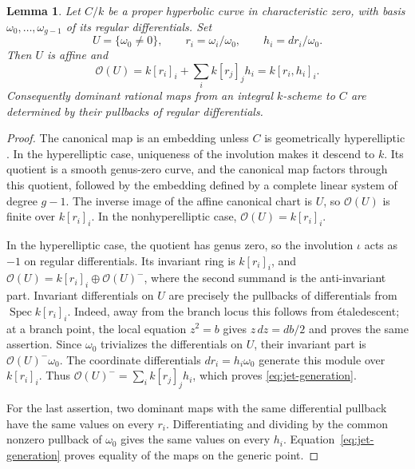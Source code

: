 \documentclass[11pt,a4paper]{article}
\numberwithin{equation}{section}
\theoremstyle{plain}
\newtheorem{lemma}[theorem]{Lemma}
\theoremstyle{definition}
\theoremstyle{remark}
\newcommand{\cO}{\mathcal O}
\newcommand{\etale}{\'etale}
\DeclareMathOperator{\Spec}{Spec}
\begin{document}
\begin{lemma}
\label{lem:first-jets}
Let $C/k$ be a proper hyperbolic curve in characteristic zero, with basis
$\omega_0,\ldots,\omega_{g-1}$ of its regular differentials. Set
\[
 U=\{\omega_0\ne0\},\qquad
 r_i=\omega_i/\omega_0,\qquad h_i=dr_i/\omega_0.
\]
Then $U$ is affine and
\begin{equation}
             \cO(U)=k[r_i]_i+\sum_i k[r_j]_j h_i=k[r_i,h_i]_i.
 \label{eq:jet-generation}
\end{equation}
Consequently dominant rational maps from an integral $k$-scheme to $C$
are determined by their pullbacks of regular differentials.
\end{lemma}
\begin{proof}
The canonical map is an embedding unless $C$ is geometrically
hyperelliptic \cite[Lemma~10.4(1)--(2)]{Mochizuki1999}.
In the hyperelliptic case, uniqueness of the involution makes it descend
to $k$. Its quotient is a smooth genus-zero curve, and the canonical
map factors through this quotient, followed by the embedding defined by
a complete linear system of degree $g-1$.
The inverse image of the affine canonical chart is $U$, so
$\cO(U)$ is finite over $k[r_i]_i$. In the nonhyperelliptic case,
$\cO(U)=k[r_i]_i$.

In the hyperelliptic case, the quotient has genus zero, so the involution
$\iota$ acts as $-1$ on regular differentials. Its invariant ring is $k[r_i]_i$, and
$\cO(U)=k[r_i]_i\oplus\cO(U)^-$, where the second summand is the
anti-invariant part. Invariant differentials on $U$ are precisely the
pullbacks of differentials from $\Spec k[r_i]_i$. Indeed, away from
the branch locus this follows from \etale descent; at a branch point,
the local equation $z^2=b$ gives $z\,dz=db/2$ and proves the same
assertion. Since $\omega_0$ trivializes the differentials on $U$, their
invariant part is $\cO(U)^-\omega_0$. The coordinate differentials
$dr_i=h_i\omega_0$ generate this module over $k[r_i]_i$. Thus
$\cO(U)^-=\sum_i k[r_j]_j h_i$, which proves
\eqref{eq:jet-generation}.

For the last assertion, two dominant maps with the same differential
pullback have the same values on every $r_i$. Differentiating and dividing
by the common nonzero pullback of $\omega_0$ gives the same values on
every $h_i$. Equation~\eqref{eq:jet-generation} proves equality of the
maps on the generic point.
\end{proof}
\end{document}
